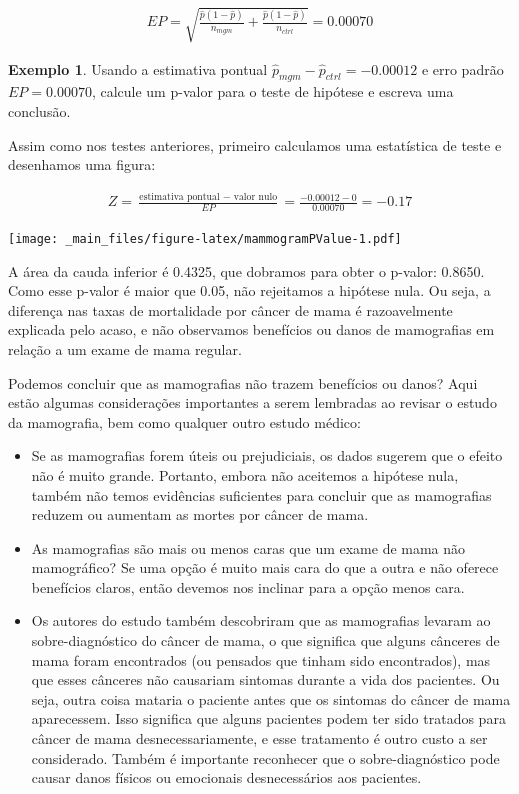 \documentclass[
]{book}
\theoremstyle{definition}
\theoremstyle{definition}
\newtheorem{example}{Exemplo}[chapter]
\theoremstyle{definition}
\theoremstyle{definition}
\theoremstyle{remark}
\begin{document}
\begin{align*}
EP = \sqrt{\frac{\hat{p}(1-\hat{p})}{n_{mgm}}
        + \frac{\hat{p}(1-\hat{p})}{n_{ctrl}}}
    = 0.00070
\end{align*}

\begin{example}
\protect\hypertarget{exm:unnamed-chunk-234}{}{\label{exm:unnamed-chunk-234} }Usando a estimativa pontual \(\hat{p}_{mgm} - \hat{p}_{ctrl} = -0.00012\) e erro padrão \(EP = 0.00070\), calcule um p-valor para o teste de hipótese e escreva uma conclusão.
\end{example}

Assim como nos testes anteriores, primeiro calculamos uma estatística de teste e desenhamos uma figura:

\begin{align*}  
Z = \frac{\text{estimativa pontual } - \text{ valor nulo}}{EP}
    = \frac{-0.00012 - 0}{0.00070}
    = -0.17
\end{align*}

\texttt{[image: \_main\_files/figure-latex/mammogramPValue-1.pdf]}

A área da cauda inferior é 0.4325, que dobramos para obter o p-valor: 0.8650. Como esse p-valor é maior que 0.05, não rejeitamos a hipótese nula. Ou seja, a diferença nas taxas de mortalidade por câncer de mama é razoavelmente explicada pelo acaso, e não observamos benefícios ou danos de mamografias em relação a um exame de mama regular.

Podemos concluir que as mamografias não trazem benefícios ou danos? Aqui estão algumas considerações importantes a serem lembradas ao revisar o estudo da mamografia, bem como qualquer outro estudo médico:

\begin{itemize}
\item
  Se as mamografias forem úteis ou prejudiciais, os dados sugerem que o efeito não é muito grande. Portanto, embora não aceitemos a hipótese nula, também não temos evidências suficientes para concluir que as mamografias reduzem ou aumentam as mortes por câncer de mama.
\item
  As mamografias são mais ou menos caras que um exame de mama não mamográfico? Se uma opção é muito mais cara do que a outra e não oferece benefícios claros, então devemos nos inclinar para a opção menos cara.
\item
  Os autores do estudo também descobriram que as mamografias levaram ao sobre-diagnóstico do câncer de mama, o que significa que alguns cânceres de mama foram encontrados (ou pensados que tinham sido encontrados), mas que esses cânceres não causariam sintomas durante a vida dos pacientes. Ou seja, outra coisa mataria o paciente antes que os sintomas do câncer de mama aparecessem. Isso significa que alguns pacientes podem ter sido tratados para câncer de mama desnecessariamente, e esse tratamento é outro custo a ser considerado. Também é importante reconhecer que o sobre-diagnóstico pode causar danos físicos ou emocionais desnecessários aos pacientes.
\end{itemize}
\end{document}
